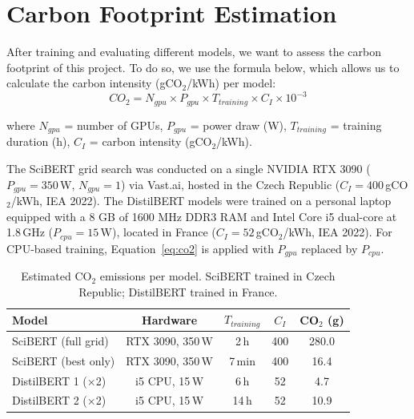 \documentclass{article}
\theoremstyle{plain}
\theoremstyle{definition}
\theoremstyle{remark}
\begin{document}


\section{Carbon Footprint Estimation}
After training and evaluating different models, we want to assess the carbon footprint of this project. To do so, we use the formula below, which allows us to calculate the carbon intensity (gCO$_2$/kWh) per model:
\[CO_2 = N_{gpu} \times P_{gpu} \times T_{training} \times C_I \times 10^{-3}\]

{\small where $N_{gpu}$ = number of GPUs, $P_{gpu}$ = power draw (W),
$T_{training}$ = training duration (h), $C_I$ = carbon intensity (gCO$_2$/kWh)}.

The SciBERT grid search was conducted on a single NVIDIA RTX 3090 ($P_{gpu} = 350$\,W, $N_{gpu} = 1$) via Vast.ai, hosted in the Czech Republic ($C_I = 400$\,gCO$_2$/kWh, IEA 2022). The DistilBERT models were trained on a personal laptop equipped with a 8 GB of 1600 MHz DDR3 RAM and Intel Core i5 dual-core at 1.8\,GHz ($P_{cpu} = 15$\,W), located in France ($C_I = 52$\,gCO$_2$/kWh, IEA 2022). For CPU-based training, Equation~\ref{eq:co2} is applied with $P_{gpu}$ replaced by $P_{cpu}$.

\begin{table}[H]
\centering
\small
\begin{tabular}{|l|c|c|c|c|}
\hline
\textbf{Model} & \textbf{Hardware} & \textbf{$T_{training}$} & \textbf{$C_I$} & \textbf{CO$_2$ (g)} \\
\hline
SciBERT (full grid)  & RTX 3090, 350\,W & 2\,h    & 400 & 280.0 \\
SciBERT (best only)  & RTX 3090, 350\,W & 7\,min  & 400 &  16.4 \\
\hline
DistilBERT 1 (×2)    & i5 CPU, 15\,W    & 6\,h    &  52 &   4.7 \\
DistilBERT 2 (×2)    & i5 CPU, 15\,W    & 14\,h   &  52 &  10.9 \\
\hline
\end{tabular}
\caption{\small Estimated CO$_2$ emissions per model. SciBERT trained in Czech Republic; DistilBERT trained in France.}
\label{tab:co2}
\end{table}
\end{document}
